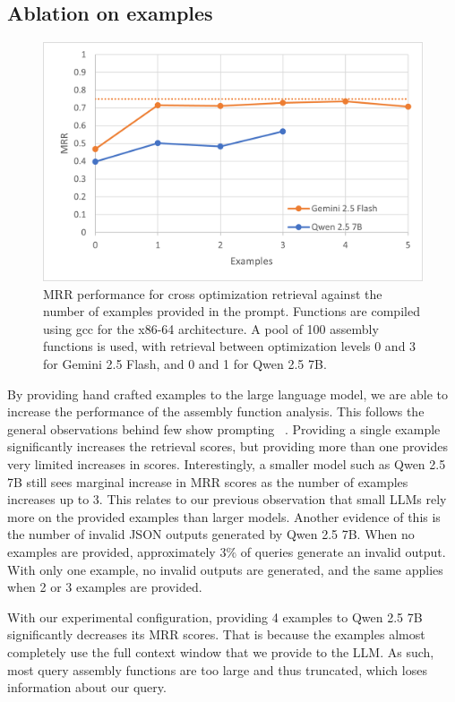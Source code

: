 \documentclass[conference,compsoc]{IEEEtran}
\begin{document}
\subsection{Ablation on examples}

\begin{figure}[htbp]
\centerline{\includegraphics[width=\linewidth]{examples-ablation}}
\caption{MRR performance for cross optimization retrieval against the number of examples provided in the prompt. Functions are compiled
using gcc for the x86-64 architecture. A pool of 100 assembly functions is used, with retrieval between optimization levels 0 and 3
for Gemini 2.5 Flash, and 0 and 1 for Qwen 2.5 7B.}
\label{ex-abl}
\end{figure}

By providing hand crafted examples to the large language model, we are able to increase the performance of the assembly function analysis.
This follows the general observations behind few show prompting ~\cite{few-shot}. Providing a single example significantly increases the retrieval
scores, but providing more than one provides very limited increases in scores. Interestingly, a smaller model
such as Qwen 2.5 7B still sees marginal increase in MRR scores as the number of examples increases up to 3. This relates to our previous observation
that small LLMs rely more on the provided examples than larger models. Another evidence of this is the number of invalid JSON outputs generated by
Qwen 2.5 7B. When no examples are provided, approximately \(3\%\) of queries generate an invalid output. With only one example, no invalid
outputs are generated, and the same applies when 2 or 3 examples are provided.

With our experimental configuration, providing 4 examples to Qwen 2.5 7B significantly decreases its MRR scores. That is because
the examples almost completely use the full context window that we provide to the LLM. As such, most query assembly functions are
too large and thus truncated, which loses information about our query.
\end{document}
